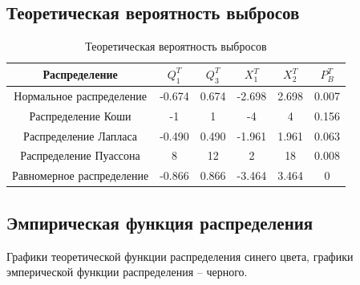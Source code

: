 \subsection{Теоретическая вероятность выбросов}

\begin{table}[H]
	\begin{center}
		\begin{tabular}{|c|c|c|c|c|c|}
			\hline 
			Распределение & $Q_{1}^{T}$ & $Q_{3}^{T}$ & $X_{1}^{T}$ & $X_{2}^{T}$ & $P_{B}^{T}$ \\
			\hline\hline 
			 Нормальное распределение & -0.674 & 0.674  & -2.698  & 2.698 & 0.007\\
			\hline
			 Распределение Коши & -1 & 1 &-4  &4 &0.156\\
			\hline
			 Распределение Лапласа & -0.490 & 0.490 &-1.961  &1.961 &0.063\\
			\hline
			 Распределение Пуассона &8 &12  &2  &18 & 0.008 \\
			\hline
			 Равномерное распределение &-0.866 &0.866  &-3.464  &3.464 &0\\
			\hline
		\end{tabular}
	\end{center}
    \caption{Теоретическая вероятность выбросов}
\end{table}

\subsection{Эмпирическая функция распределения}

Графики теоретической функции распределения синего цвета, графики эмперической функции распределения -- черного. \\


